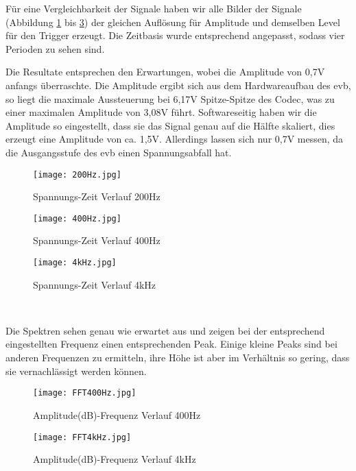 Für eine Vergleichbarkeit der Signale haben wir alle Bilder der Signale (Abbildung \ref{fig:Scope200Hz} bis \ref{fig:Scope4kHz}) 
der gleichen Auflösung für Amplitude und demselben Level für den Trigger erzeugt. 
Die Zeitbasis wurde entsprechend angepasst, sodass vier Perioden zu sehen 
sind.\\\par
Die Resultate entsprechen den Erwartungen, wobei die Amplitude von 0,7V anfangs überraschte. 
Die Amplitude ergibt sich aus dem Hardwareaufbau des \gls{evb}, so liegt die maximale Aussteuerung bei 6,17V Spitze-Spitze des Codec, was zu einer maximalen Amplitude von 3,08V 
führt.
Softwareseitig haben wir die Amplitude so eingestellt, dass sie das Signal genau auf die Hälfte skaliert, dies erzeugt eine Amplitude von ca. 1,5V.
Allerdings lassen sich nur 0,7V messen, da die Ausgangsstufe des \gls{evb} einen Spannungsabfall hat.
\begin{figure}[h!]
  \centering
    \texttt{[image: 200Hz.jpg]}
  \caption{Spannungs-Zeit Verlauf 200Hz}
  \label{fig:Scope200Hz}
\end{figure}
\begin{figure}[t!]
  \centering
    \texttt{[image: 400Hz.jpg]}
  \caption{Spannungs-Zeit Verlauf 400Hz}
  \label{fig:Scope400Hz}
\end{figure}
\begin{figure}[b!]
  \centering
    \texttt{[image: 4kHz.jpg]}
  \caption{Spannungs-Zeit Verlauf 4kHz}
  \label{fig:Scope4kHz}
\end{figure}\\\par
Die Spektren sehen genau wie erwartet aus und zeigen bei der entsprechend eingestellten Frequenz einen entsprechenden Peak. 
Einige kleine Peaks sind bei anderen Frequenzen zu ermitteln, ihre Höhe ist aber im Verhältnis so gering, dass sie vernachlässigt werden können.
\begin{figure}[bp!]
    \centerline{
    \texttt{[image: FFT400Hz.jpg]}}
  \caption{Amplitude(dB)-Frequenz Verlauf 400Hz}
  \label{fig:FFT400Hz}
\end{figure}
\begin{figure}[bp!]
  \centering
    \texttt{[image: FFT4kHz.jpg]}
  \caption{Amplitude(dB)-Frequenz Verlauf 4kHz}
  \label{fig:FFT4kHz}
\end{figure}


